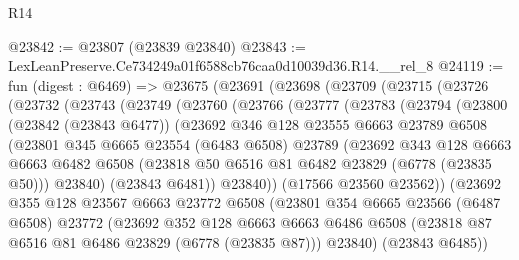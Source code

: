 \begin{lexlean}{R14}
\begin{coremodule}
@23842 := @23807 (@23839 @23840)
@23843 := LexLeanPreserve.Ce734249a01f6588cb76caa0d10039d36.R14.__rel_8
@24119 := fun (digest : @6469) =>
  @23675
    (@23691
      (@23698
        (@23709
          (@23715
            (@23726
              (@23732
                (@23743
                  (@23749
                    (@23760
                      (@23766
                        (@23777
                          (@23783
                            (@23794
                              (@23800
                                (@23842 (@23843 @6477))
                                (@23692
                                  @346
                                  @128
                                  @23555
                                  @6663
                                  @23789
                                  @6508
                                  (@23801
                                    @345
                                    @6665
                                    @23554
                                    (@6483 @6508)
                                    @23789
                                    (@23692
                                      @343
                                      @128
                                      @6663
                                      @6663
                                      @6482
                                      @6508
                                      (@23818 @50 @6516 @81 @6482 @23829 (@6778 (@23835 @50)))
                                      @23840)
                                    (@23843 @6481))
                                  @23840))
                              (@17566 @23560 @23562))
                            (@23692
                              @355
                              @128
                              @23567
                              @6663
                              @23772
                              @6508
                              (@23801
                                @354
                                @6665
                                @23566
                                (@6487 @6508)
                                @23772
                                (@23692
                                  @352
                                  @128
                                  @6663
                                  @6663
                                  @6486
                                  @6508
                                  (@23818 @87 @6516 @81 @6486 @23829 (@6778 (@23835 @87)))
                                  @23840)
                                (@23843 @6485))

\end{coremodule}
\end{lexlean}
